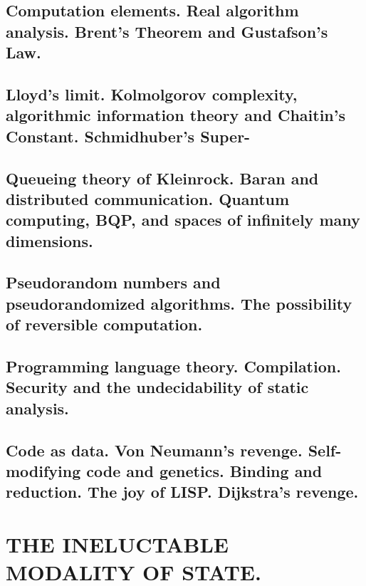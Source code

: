 \documentclass[letterpaper,draft]{memoir}
\begin{document}
\chapter{Computation elements. Real algorithm analysis. Brent's Theorem and
Gustafson's Law.}

\chapter{Lloyd's limit. Kolmolgorov complexity, algorithmic information theory and
Chaitin's Constant. Schmidhuber's Super- }

\chapter{Queueing theory of Kleinrock. Baran and distributed communication. Quantum
computing, BQP, and spaces of infinitely many dimensions.}

\chapter{Pseudorandom numbers and pseudorandomized algorithms. The possibility of
reversible computation.}

\chapter{Programming language theory. Compilation. Security and the undecidability of
static analysis.}

\chapter{Code as data. Von Neumann's revenge. Self-modifying code and genetics.
Binding and reduction. The joy of LISP\@. Dijkstra's revenge.}

\part{THE INELUCTABLE MODALITY OF STATE\@.}

\end{document}
